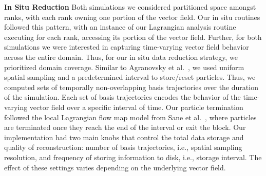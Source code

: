 \noindent\textbf{In Situ Reduction}
%
%
Both simulations we considered partitioned space amongst ranks,
with each rank owning one portion of the vector field.
Our in situ routines followed this pattern, with an
instance of our Lagrangian analysis
routine executing for each rank, accessing its portion
of the vector field.
%
Further, for both simulations we were interested in capturing time-varying vector field behavior across the entire domain.
%
Thus, for our in situ data reduction strategy, we prioritized domain coverage.
%
Similar to Agranovsky et al.~\cite{agranovsky2014improved}, we used uniform spatial sampling and a predetermined interval to store/reset particles.
%
Thus, we computed sets of temporally non-overlapping basis trajectories over the duration of the simulation.
%
%
Each set of basis trajectories encodes the behavior of the time-varying vector field over a specific interval of time.
%
%
%
Our particle termination followed the local Lagrangian flow map model from Sane et al.~\cite{sane2020scalable}, where particles are terminated once they reach the end of the interval or exit the block.
%
Our implementation had two main knobs that control the total data storage and quality of reconstruction: number of basis trajectories, i.e., spatial sampling resolution, and frequency of storing information to disk, i.e., storage interval.
%
The effect of these settings varies depending on the underlying vector field. 
%

